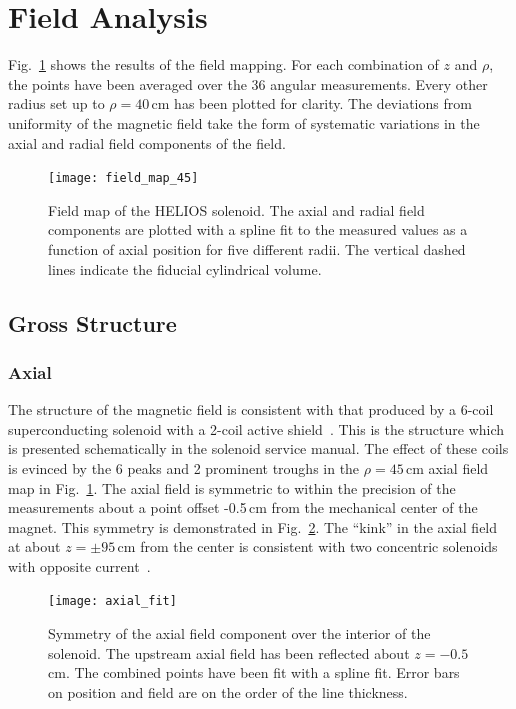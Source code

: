 \section{Field Analysis}
Fig.~\ref{map} shows the results of the field mapping.  For each combination of $z$ and $\rho$, the points have been averaged over the 36 angular measurements.  Every other radius set up to $\rho=40$\,cm has been plotted for clarity.  The deviations from uniformity of the magnetic field take the form of systematic variations in the axial and radial field components of the field.    

\begin{figure}%
\centering
\texttt{[image: field\_map\_45]}%
\caption[Field map of the HELIOS solenoid]{Field map of the HELIOS solenoid.  The axial and radial field components are plotted with a spline fit to the measured values as a function of axial position for five different radii.  The vertical dashed lines indicate the fiducial cylindrical volume.}%
\label{map}%
\end{figure}

\subsection{Gross Structure}
\subsubsection{Axial}
The structure of the magnetic field is consistent with that produced by a 6-coil superconducting solenoid with a 2-coil active shield~\cite{Montgomery_1969}.  This is the structure which is presented schematically in the solenoid service manual.  The effect of these coils is evinced by the 6 peaks and 2 prominent troughs in the $\rho=45$\,cm axial field map in Fig.~\ref{map}.  The axial field is symmetric to within the precision of the measurements about a point offset -0.5\,cm from the mechanical center of the magnet.  This symmetry is demonstrated in Fig.~\ref{axial_reflect}.  The ``kink'' in the axial field at about $z= \pm95$\,cm from the center is consistent with two concentric solenoids with opposite current~\cite{Montgomery_1969}.

\begin{figure}%
\texttt{[image: axial\_fit]}%
\caption[Symmetry of the axial field component over the interior of the solenoid]{Symmetry of the axial field component over the interior of the solenoid. The upstream axial field has been reflected about $z=-0.5$\,cm.  The combined points have been fit with a spline fit.  Error bars on position and field are on the order of the line thickness.  }
\label{axial_reflect}%
\end{figure}

